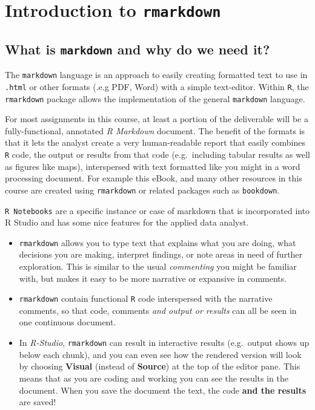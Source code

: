 \documentclass[
]{book}
\providecommand{\tightlist}{%
  \setlength{\itemsep}{0pt}\setlength{\parskip}{0pt}}
\begin{document}
\hypertarget{introduction-to-rmarkdown}{%
\chapter{\texorpdfstring{Introduction to \texttt{rmarkdown}}{Introduction to rmarkdown}}\label{introduction-to-rmarkdown}}

\hypertarget{what-is-markdown-and-why-do-we-need-it}{%
\section{\texorpdfstring{What is \texttt{markdown} and why do we need it?}{What is markdown and why do we need it?}}\label{what-is-markdown-and-why-do-we-need-it}}

The \texttt{markdown} language is an approach to easily creating formatted text to use in \texttt{.html} or other formats (.e.g PDF, Word) with a simple text-editor. Within \texttt{R}, the \texttt{rmarkdown} package allows the implementation of the general \texttt{markdown} language.

For most assignments in this course, at least a portion of the deliverable will be a fully-functional, annotated \emph{R Markdown} document. The benefit of the formats is that it lets the analyst create a very human-readable report that easily combines \texttt{R} code, the output or results from that code (e.g.~including tabular results as well as figures like maps), interspersed with text formatted like you might in a word processing document. For example this eBook, and many other resources in this course are created using \texttt{rmarkdown} or related packages such as \texttt{bookdown}.

\texttt{R\ Notebooks} are a specific instance or case of markdown that is incorporated into R Studio and has some nice features for the applied data analyst.

\begin{itemize}
\tightlist
\item
  \texttt{rmarkdown} allows you to type text that explains what you are doing, what decisions you are making, interpret findings, or note areas in need of further exploration. This is similar to the usual \emph{commenting} you might be familiar with, but makes it easy to be more narrative or expansive in comments.
\item
  \texttt{rmarkdown} contain functional \texttt{R} code interspersed with the narrative comments, so that code, comments \emph{and output or results} can all be seen in one continuous document.
\item
  In \emph{R-Studio}, \texttt{rmarkdown} can result in interactive results (e.g.~output shows up below each chunk), and you can even see how the rendered version will look by choosing \textbf{Visual} (instead of \textbf{Source}) at the top of the editor pane. This means that as you are coding and working you can see the results in the document. When you save the document the text, the code \textbf{and the results} are saved!
\end{itemize}
\end{document}
